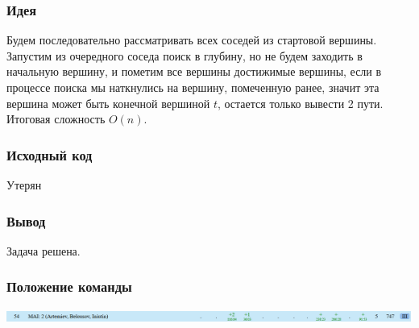 
\subsubsection*{Идея}
Будем последовательно рассматривать всех соседей из стартовой вершины. Запустим из очередного соседа поиск в глубину, но не будем заходить в начальную вершину, и пометим все вершины достижимые вершины, если в процессе поиска мы наткнулись на вершину, помеченную ранее, значит эта вершина может быть конечной вершиной $t$, остается только вывести 2 пути. Итоговая сложность $O(n)$.
\subsubsection*{Исходный код}
Утерян

\subsubsection*{Вывод}
Задача решена.
\subsubsection*{Положение команды}
\includegraphics[scale=0.25]{images/220413.png}\newline\noindent
\pagebreak